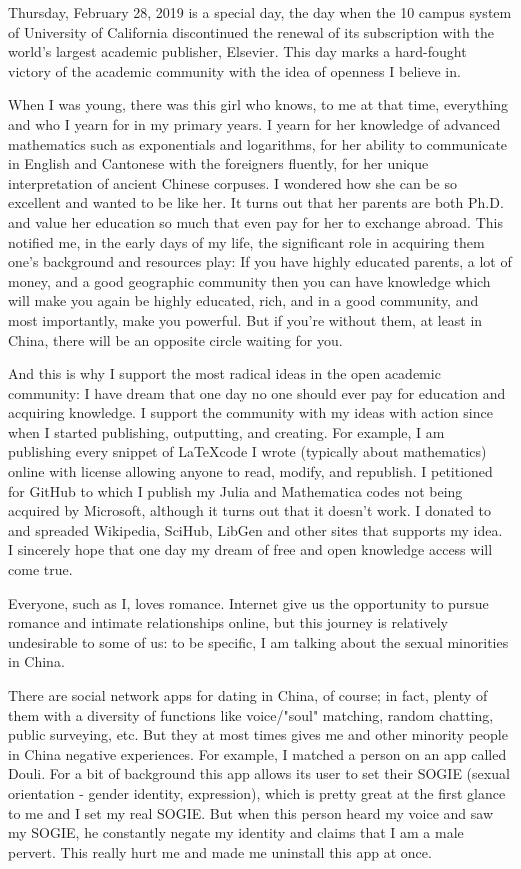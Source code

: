\documentclass[10pt]{article}
\begin{document}
\begin{CJK*}{UTF8}{gbsn}
\newpage
Thursday, February 28, 2019 is a special day, the day when the 10 campus system of University of California discontinued the renewal of its subscription with the world's largest academic publisher, Elsevier. This day marks a hard-fought victory of the academic community with the idea of openness I believe in.

When I was young, there was this girl who knows, to me at that time, everything and who I yearn for in my primary years. I yearn for her knowledge of advanced mathematics such as exponentials and logarithms, for her ability to communicate in English and Cantonese with the foreigners fluently, for her unique interpretation of ancient Chinese corpuses. I wondered how she can be so excellent and wanted to be like her. It turns out that her parents are both Ph.D. and value her education so much that even pay for her to exchange abroad. This notified me, in the early days of my life, the significant role in acquiring them one's background and resources play: If you have highly educated parents, a lot of money, and a good geographic community then you can have knowledge which will make you again be highly educated, rich, and in a good community, and most importantly, make you powerful. But if you're without them, at least in China, there will be an opposite circle waiting for you.

And this is why I support the most radical ideas in the open academic community: I have dream that one day no one should ever pay for education and acquiring knowledge. I support the community with my ideas with action since when I started publishing, outputting, and creating. For example, I am publishing every snippet of \LaTeX code I wrote (typically about mathematics) online with license allowing anyone to read, modify, and republish. I petitioned for GitHub to which I publish my Julia and Mathematica codes not being acquired by Microsoft, although it turns out that it doesn't work. I donated to and spreaded Wikipedia, SciHub, LibGen and other sites that supports my idea. I sincerely hope that one day my dream of free and open knowledge access will come true.

\newpage
Everyone, such as I, loves romance. Internet give us the opportunity to pursue romance and intimate relationships online, but this journey is relatively undesirable to some of us: to be specific, I am talking about the sexual minorities in China.

There are social network apps for dating in China, of course; in fact, plenty of them with a diversity of functions like voice/"soul" matching, random chatting, public surveying, etc. But they at most times gives me and other minority people in China negative experiences. For example, I matched a person on an app called Douli. For a bit of background this app allows its user to set their SOGIE (sexual orientation - gender identity, expression), which is pretty great at the first glance to me and I set my real SOGIE. But when this person heard my voice and saw my SOGIE, he constantly negate my identity and claims that I am a male pervert. This really hurt me and made me uninstall this app at once.


\end{CJK*}
\end{document}
